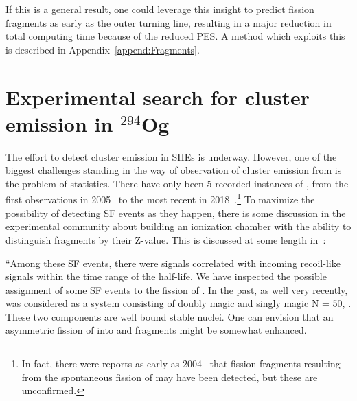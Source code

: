 If this is a general result, one could leverage this insight to predict fission fragments as early as the outer turning line, resulting in a major reduction in total computing time because of the reduced PES. A method which exploits this is described in Appendix~\ref{append:Fragments}. %


\section{Experimental search for cluster emission in $^{294}$Og}

The effort to detect cluster emission in SHEs is underway. However, one of the biggest challenges standing in the way of observation of cluster emission from {\Og} is the problem of statistics. There have only been 5 recorded instances of {\Og}, from the first observations in 2005~\cite{Oganessian2006} to the most recent in 2018~\cite{Brewer2018}.\footnote{In fact, there were reports as early as 2004~\cite{Oganessian2004} that fission fragments resulting from the spontaneous fission of {\Og} may have been detected, but these are unconfirmed.} To maximize the possibility of detecting SF events as they happen, there is some discussion in the experimental community about building an ionization chamber with the ability to distinguish fragments by their Z-value. This is discussed at some length in~\cite{Brewer2018}:

``Among these SF events, there were signals correlated with incoming recoil-like signals within the time range of the {\Og} half-life. We have inspected the possible assignment of some SF events to the fission of {\Og}. In the past, as well very recently, {\Og} was considered as a system consisting of doubly magic {\Pb} and singly magic N = 50, {\Kr}. These two components are well bound stable nuclei. One can envision that an asymmetric fission of {\Og} into {\Pb} and {\Kr} fragments might be somewhat enhanced.

